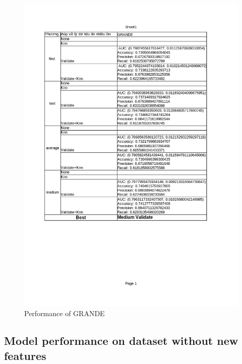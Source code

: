 \documentclass[../main.tex]{subfiles}
\begin{document}
 \begin{figure}[H]
    \centering
    \includegraphics[width=\textwidth]{Figure/KidneyResultNoLimit-new_GRANDE.png}
    \caption{Performance of GRANDE}
    \label{fig:KidneyResultNoLimit-new_GRANDE}
\end{figure}


\subsection{Model performance on dataset without new features}
\end{document}
